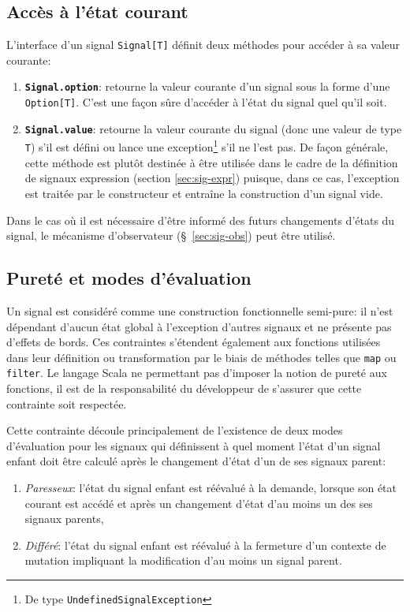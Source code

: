 \subsection{Accès à l'état courant}
L'interface d'un signal \texttt{Signal[T]} définit deux méthodes pour accéder à sa valeur courante:
\begin{enumerate}
	\item \textbf{\texttt{Signal.option}}: retourne la valeur courante d'un signal sous la forme d'une \texttt{Option[T]}. C'est une façon sûre d'accéder à l'état du signal quel qu'il soit.
	
	\item \textbf{\texttt{Signal.value}}: retourne la valeur courante du signal (donc une valeur de type \texttt{T}) s'il est défini ou lance une exception\footnote{De type \texttt{UndefinedSignalException}} s'il ne l'est pas. De façon générale, cette méthode est plutôt destinée à être utilisée dans le cadre de la définition de signaux expression (section \ref{sec:sig-expr}) puisque, dans ce cas, l'exception est traitée par le constructeur et entraîne la construction d'un signal vide.
\end{enumerate}

Dans le cas où il est nécessaire d'être informé des futurs changements d'états du signal, le mécanisme d'observateur (§~\ref{sec:sig-obs}) peut être utilisé.

\subsection{Pureté et modes d'évaluation} \label{sec:sig-pureness}
Un signal est considéré comme une construction fonctionnelle semi-pure: il n'est dépendant d'aucun état global à l'exception d'autres signaux et ne présente pas d'effets de bords. Ces contraintes s'étendent également aux fonctions utilisées dans leur définition ou transformation par le biais de méthodes telles que \texttt{map} ou \texttt{filter}. Le langage Scala ne permettant pas d'imposer la notion de pureté aux fonctions, il est de la responsabilité du développeur de s'assurer que cette contrainte soit respectée.

Cette contrainte découle principalement de l'existence de deux modes d'évaluation pour les signaux qui définissent à quel moment l'état d'un signal enfant doit être calculé après le changement d'état d'un de ses signaux parent:

\begin{enumerate}
	\item \emph{Paresseux}: l'état du signal enfant est réévalué à la demande, lorsque son état courant est accédé et après un changement d'état d'au moins un des ses signaux parents,
	\item \emph{Différé}: l'état du signal enfant est réévalué à la fermeture d'un contexte de mutation impliquant la modification d'au moins un signal parent.
\end{enumerate}

